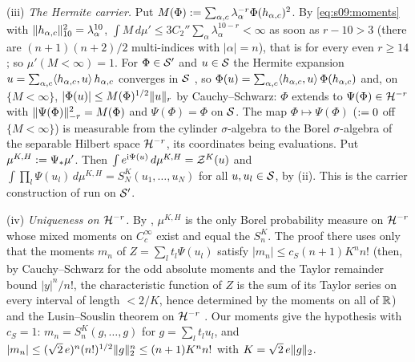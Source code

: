 (iii) \emph{The Hermite carrier.} Put $M(\Phi):=\sum_{\alpha,c}\lambda_\alpha^{-r}\Phi(h_{\alpha,c})^2$. By \eqref{eq:s09:moments} with $\lVert h_{\alpha,c}\rVert_{10}^2=\lambda_\alpha^{10}$, $\int M\,d\mu'\le3C_2''\sum_\alpha\lambda_\alpha^{10-r}<\infty$ as soon as $r-10>3$ (there are $(n+1)(n+2)/2$ multi-indices with $|\alpha|=n$), that is for every even $r\ge14$; so $\mu'(M<\infty)=1$. For $\Phi\in\mathcal S'$ and $u\in\mathcal S$ the Hermite expansion $u=\sum_{\alpha,c}\langle h_{\alpha,c},u\rangle\,h_{\alpha,c}$ converges in $\mathcal S$ \cite[Thm.~V.13]{RS1}, so $\Phi(u)=\sum_{\alpha,c}\langle h_{\alpha,c},u\rangle\,\Phi(h_{\alpha,c})$ and, on $\{M<\infty\}$, $|\Phi(u)|\le M(\Phi)^{1/2}\lVert u\rVert_r$ by Cauchy--Schwarz: $\Phi$ extends to $\Psi(\Phi)\in\mathcal H^{-r}$ with $\lVert \Psi(\Phi)\rVert_{-r}^2=M(\Phi)$ and $\Psi(\Phi)=\Phi$ on $\mathcal S$. The map $\Phi\mapsto\Psi(\Phi)$ ($:=0$ off $\{M<\infty\}$) is measurable from the cylinder $\sigma$-algebra to the Borel $\sigma$-algebra of the separable Hilbert space $\mathcal H^{-r}$, its coordinates being evaluations. Put $\mu^{K,H}:=\Psi_*\mu'$. Then $\int e^{\mathrm i\Psi(u)}\,d\mu^{K,H}=\mathcal Z^K(u)$ and $\int\prod_l\Psi(u_l)\,d\mu^{K,H}=S^K_N(u_1,\dots,u_N)$ for all $u,u_l\in\mathcal S$, by (ii). This is the carrier construction of \cite[Lemma~10.5(b)]{SymPhase} run on $\mathcal S'$.

(iv) \emph{Uniqueness on $\mathcal H^{-r}$.} By \cite[Lemma~10.5(c)]{SymPhase}, $\mu^{K,H}$ is the only Borel probability measure on $\mathcal H^{-r}$ whose mixed moments on $C^\infty_c$ exist and equal the $S^K_n$. The proof there uses only that the moments $m_n$ of $Z=\sum_lt_l\Psi(u_l)$ satisfy $|m_n|\le c_S(n+1)K^nn!$ (then, by Cauchy--Schwarz for the odd absolute moments and the Taylor remainder bound $|y|^n/n!$, the characteristic function of $Z$ is the sum of its Taylor series on every interval of length $<2/K$, hence determined by the moments on all of $\mathbb R$) and the Lusin--Souslin theorem on $\mathcal H^{-r}$ \cite{Kec95}. Our moments give the hypothesis with $c_S=1$: $m_n=S^K_n(g,\dots,g)$ for $g=\sum_lt_lu_l$, and $|m_n|\le(\sqrt2\,e)^n(n!)^{1/2}\lVert g\rVert_2^n\le(n+1)K^nn!$ with $K=\sqrt2\,e\lVert g\rVert_2$.


